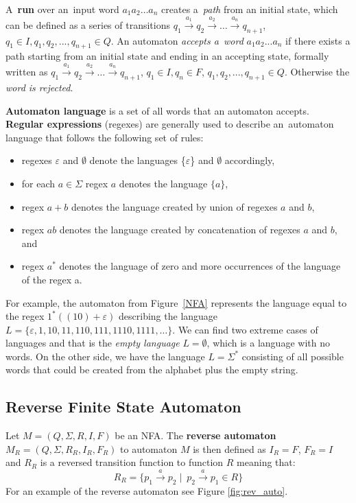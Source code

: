 A~\textbf{run} over an~input word ${a_1 a_2 \dots a_n}$ creates a~\textit{path} from an initial state, which can be defined as a series of transitions ${q_1 \xrightarrow{a_1} q_2 \xrightarrow{a_2} \dots \xrightarrow{a_n} q_{n+1}}$, ${q_1 \in I}, {q_1,q_2,...,q_{n+1} \in Q}$.
An automaton \textit{accepts a~word} ${a_1a_2...a_n}$ if there exists a path starting from an initial state and ending in an accepting state, formally written as ${q_1 \xrightarrow{a_1} q_2 \xrightarrow{a_2} \dots \xrightarrow{a_n} q_{n+1}}$, ${q_1 \in I}, {q_n \in F}$, $ {q_1,q_2,...,q_{n+1} \in Q}$.
Otherwise the \textit{word is rejected}.

\textbf{Automaton language} is a set of all words that an automaton accepts. \\

\textbf{Regular expressions} (regexes) are generally used to describe an~automaton language that follows the following set of rules:
\begin{itemize}
    \item regexes $\varepsilon$ and $\emptyset$ denote the languages \{$\varepsilon$\} and $\emptyset$ accordingly,
    \item for each $a \in \Sigma$ regex $a$ denotes the language $\{a\}$,
    \item regex $a+b$ denotes the language created by union of regexes $a$ and $b$,
    \item regex $ab$ denotes the language created by concatenation of regexes $a$ and $b$, and
    \item regex $a^*$ denotes the language of zero and more occurrences of the language of the regex a.
\end{itemize}
 For example, the automaton from Figure~\ref{NFA} represents the language equal to the regex ${1^*((10)+\varepsilon)}$ describing the language ${L=\{\varepsilon, 1, 10, 11, 110, 111, 1110, 1111, \dots \}}$. We can find two extreme cases of languages and that is the \textit{empty language} $L=\emptyset$, which is a language with no words. On the other side, we have the language $L={\Sigma^*}$ consisting of all possible words that could be created from the alphabet plus the empty string.

\subsection*{Reverse Finite State Automaton}
Let $M=(Q,\Sigma, R, I, F)$ be an NFA. The \textbf{reverse automaton} $M_R=(Q,\Sigma, R_R, I_R, F_R)$ to automaton $M$ is then defined as $I_R = F$, $F_R = I$ and $R_R$ is a reversed transition function to function $R$ meaning that:
\begin{equation*}
    R_R=\{p_1 \xrightarrow{a} p_2\mid\ p_2 \xrightarrow{a} p_1 \in R\}
\end{equation*} 
For an example of the reverse automaton see Figure \ref{fig:rev_auto}.

